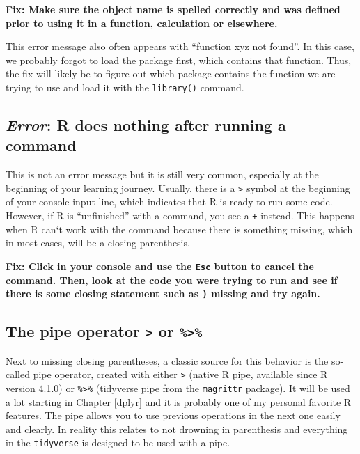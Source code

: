 \documentclass[
]{book}
\begin{document}
\textbf{Fix: Make sure the object name is spelled correctly and was defined prior to using it in a function, calculation or elsewhere.}

This error message also often appears with ``function xyz not found''.
In this case, we probably forgot to load the package first, which contains that function.
Thus, the fix will likely be to figure out which package contains the function we are trying to use and load it with the \texttt{library()} command.

\subsection*{\texorpdfstring{\emph{Error}: R does nothing after running a command}{Error: R does nothing after running a command}}\label{error-r-does-nothing-after-running-a-command}

This is not an error message but it is still very common, especially at the beginning of your learning journey.
Usually, there is a \texttt{\textgreater{}} symbol at the beginning of your console input line, which indicates that R is ready to run some code.
However, if R is ``unfinished'' with a command, you see a \texttt{+} instead.
This happens when R can`t work with the command because there is something missing, which in most cases, will be a closing parenthesis.

\textbf{Fix: Click in your console and use the \texttt{Esc} button to cancel the command. Then, look at the code you were trying to run and see if there is some closing statement such as \texttt{)} missing and try again.}

\subsection*{\texorpdfstring{The pipe operator \texttt{\textbar{}\textgreater{}} or \texttt{\%\textgreater{}\%}}{The pipe operator \textbar\textgreater{} or \%\textgreater\%}}\label{pipe}

Next to missing closing parentheses, a classic source for this behavior is the so-called pipe operator, created with either \texttt{\textbar{}\textgreater{}} (native R pipe, available since R version 4.1.0) or \texttt{\%\textgreater{}\%} (tidyverse pipe from the \texttt{magrittr} package).
It will be used a lot starting in Chapter \ref{dplyr} and it is probably one of my personal favorite R features.
The pipe allows you to use previous operations in the next one easily and clearly.
In reality this relates to not drowning in parenthesis and everything in the \texttt{tidyverse} is designed to be used with a pipe.
\end{document}
